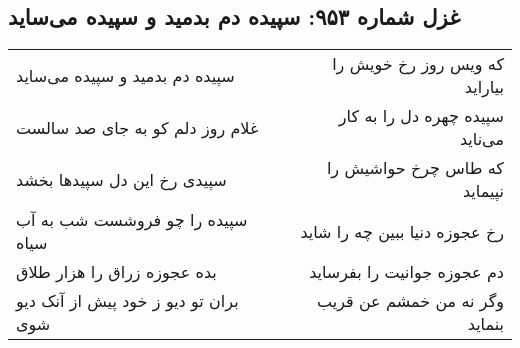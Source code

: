 \begin{center}
\section*{غزل شماره ۹۵۳: سپیده دم بدمید و سپیده می‌ساید}
\label{sec:0953}
\begin{longtable}{l p{0.5cm} r}
سپیده دم بدمید و سپیده می‌ساید
&&
که ویس روز رخ خویش را بیاراید
\\
غلام روز دلم کو به جای صد سالست
&&
سپیده چهره دل را به کار می‌ناید
\\
سپیدی رخ این دل سپیدها بخشد
&&
که طاس چرخ حواشیش را نپیماید
\\
سپیده را چو فروشست شب به آب سیاه
&&
رخ عجوزه دنیا ببین چه را شاید
\\
بده عجوزه زراق را هزار طلاق
&&
دم عجوزه جوانیت را بفرساید
\\
بران تو دیو ز خود پیش از آنک دیو شوی
&&
وگر نه من خمشم عن قریب بنماید
\\
\end{longtable}
\end{center}
